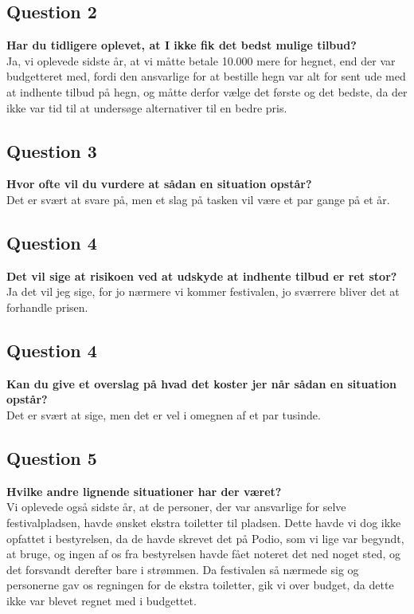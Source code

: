 \subsection{Question 2}
\label{i3q2}
\noindent \textbf{Har du tidligere oplevet, at I ikke fik det bedst mulige tilbud?}
\\
Ja, vi oplevede sidste år, at vi måtte betale 10.000 mere for hegnet, end der var budgetteret med,
fordi den ansvarlige for at bestille hegn var alt for sent ude med at indhente tilbud på hegn, og
måtte derfor vælge det første og det bedste, da der ikke var tid til at undersøge alternativer til
en bedre pris.

\subsection{Question 3}
\label{i3q4}
\noindent \textbf{Hvor ofte vil du vurdere at sådan en situation opstår?}
\\
Det er svært at svare på, men et slag på tasken vil være et par gange på et år.

\subsection{Question 4}
\label{i3q5}
\noindent \textbf{Det vil sige at risikoen ved at udskyde at indhente tilbud er ret stor?}
\\
Ja det vil jeg sige, for jo nærmere vi kommer festivalen, jo sværrere bliver det at forhandle prisen.

\subsection{Question 4}
\label{i3q5}
\noindent \textbf{Kan du give et overslag på hvad det koster jer når sådan en situation opstår?}
\\
Det er svært at sige, men det er vel i omegnen af et par tusinde.

\subsection{Question 5}
\label{i3q3}
\noindent \textbf{Hvilke andre lignende situationer har der været?}
\\
Vi oplevede også sidste år, at de personer, der var ansvarlige for selve festivalpladsen, havde
ønsket ekstra toiletter til pladsen. Dette havde vi dog ikke opfattet i bestyrelsen, da de havde
skrevet det på Podio, som vi lige var begyndt, at bruge, og ingen af os fra bestyrelsen havde fået
noteret det ned noget sted, og det forsvandt derefter bare i strømmen. Da festivalen så nærmede sig
og personerne gav os regningen for de ekstra toiletter, gik vi over budget, da dette ikke var blevet
regnet med i budgettet.
